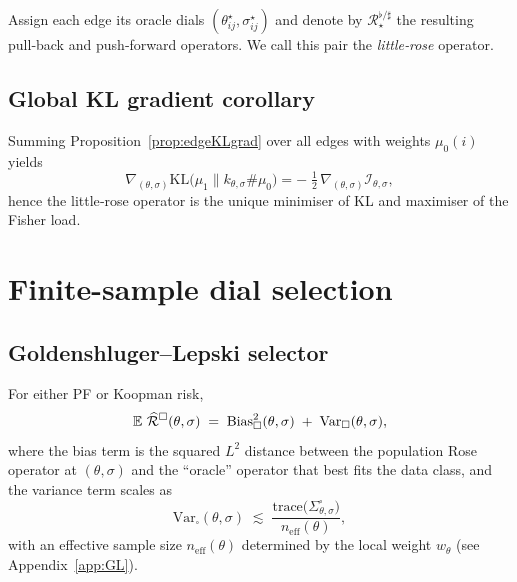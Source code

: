		\begin{definition}\label{def:littleRose}
			Assign each edge its oracle dials $(\theta_{ij}^{\star},\sigma_{ij}^{\star})$ and denote by $\mathcal R_{\star}^{\flat/\sharp}$ the resulting pull‑back and push‑forward operators.  We call this pair the \emph{little‑rose} operator.
		\end{definition}

	\subsection{Global KL gradient corollary}
		\begin{corollary}\label{cor:globalKL}
			Summing Proposition~\ref{prop:edgeKLgrad} over all edges with weights $\mu_0(i)$ yields
			\[
  				\nabla_{(\theta,\sigma)}
  				\mathrm{KL}\!\bigl(\mu_1
        				\parallel k_{\theta,\sigma}\!\#\mu_0\bigr)
 				= -\;\tfrac12\,
   				\nabla_{(\theta,\sigma)}
    				\mathcal I_{\theta,\sigma},
			\]
			hence the little‑rose operator is the unique minimiser of KL and maximiser of the Fisher load.
		\end{corollary}

\section{Finite-sample dial selection}
 	\subsection{Goldenshluger–Lepski selector}
	
		\begin{lemma}\label{lem:bv}
			For either PF or Koopman risk,
			\[
 	 			\operatorname{\mathbb{E}}\,\widehat{\mathcal R}^{\square}(\theta,\sigma)
 			 	\;=\;
  				\mathrm{Bias}^{2}_{\square}(\theta,\sigma)
  				\;+\;
  				\mathrm{Var}_{\square}(\theta,\sigma),
			\]
			where the bias term is the squared $L^{2}$ distance between the
			population Rose operator at $(\theta,\sigma)$ and the “oracle” operator
			that best fits the data class, and the variance term scales as
			\[
  				\mathrm{Var}_{\square}(\theta,\sigma)
  				\;\lesssim\;
  				\frac{ \mathrm{trace}\bigl(\Sigma_{\theta,\sigma}^{\square}\bigr) }{n_{\mathrm{eff}}(\theta)},
			\]
			with an effective sample size $n_{\mathrm{eff}}(\theta)$ determined by the
			local weight $w_\theta$ (see Appendix~\ref{app:GL}).
		\end{lemma}
  
